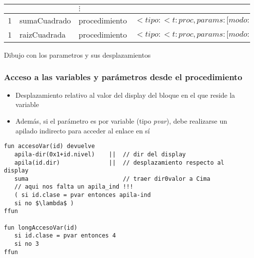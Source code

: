 \documentclass[hyperref={pdfpagelabels=false},tree-dvips,compress]{beamer}
\begin{document}
\begin{frame}[fragile]
\begin{tabular*}{\textwidth}{|l|l|l|p{}|}
               &                   & $\vdots$          &                                                                                                                                                                                                                                                                       \\ \hline
1              & sumaCuadrado      & procedimiento     & $<tipo:<t:proc, params: {[}modo:valor{]}, tipo:<tipo:<t:num>{]}{[}modo:valor, tipo:<t:num>{]}{[}modo:variable, tipo:<t:num>{]}>>>$                    \\ \hline
1              & raizCuadrada      & procedimiento     & $<tipo:<t:proc, params: {[}modo:valor{]}, tipo:<t:num>{]}>>$                                                                                                                                                   \\ \hline
\end{tabular*}


Dibujo con los parametros y sus desplazamientos

\end{frame}
\begin{frame}[fragile]
\frametitle{Acceso a las variables y parámetros desde el procedimiento}

\begin{itemize}
	\item Desplazamiento relativo al valor del display del bloque en el que reside la variable
	\item Además, si el parámetro es por variable (tipo \emph{pvar}), debe realizarse un apilado indirecto para acceder al enlace en sí
\end{itemize}

\begin{lstlisting}[style=codigoMP,basicstyle=\scriptsize\ttfamily,mathescape]
fun accesoVar(id) devuelve
   apila-dir(0x1+id.nivel)    ||  // dir del display
   apila(id.dir)              ||  // desplazamiento respecto al display
   suma                           // traer dir0valor a Cima
   // aqui nos falta un apila_ind !!!
   ( si id.clase = pvar entonces apila-ind
   si no $\lambda$ )
ffun

fun longAccesoVar(id)
   si id.clase = pvar entonces 4
   si no 3
ffun
\end{lstlisting}

\end{frame}
\end{document}
